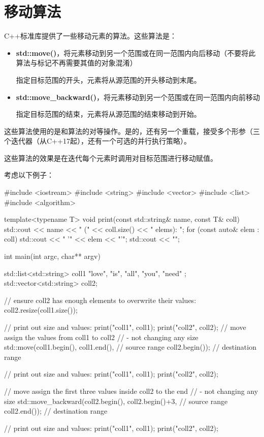 \section{移动算法}
C++标准库提供了一些移动元素的算法。这些算法是：

\begin{itemize}
	\item \textbf{std::move()}，将元素移动到另一个范围或在同一范围内向后移动（不要将此算法与标记不再需要其值的对象混淆）

	指定目标范围的开头，元素将从源范围的开头移动到末尾。
	\item \textbf{std::move_backward()}，将元素移动到另一个范围或在同一范围内向前移动

	指定目标范围的结束，元素将从源范围的结束移动到开始。
\end{itemize}

这些算法使用的是和算法的对等操作。是的，还有另一个重载，接受多个形参（三个迭代器（从C++17起），还有一个可选的并行执行策略）。

这些算法的效果是在迭代每个元素时调用对目标范围进行移动赋值。

考虑以下例子：

\begin{cppcode}
#include <iostream>
#include <string>
#include <vector>
#include <list>
#include <algorithm>

template<typename T>
void print(const std::string& name, const T& coll)
{
	std::cout << name << " (" << coll.size() << " elems): ";
	for (const auto& elem : coll) {
		std::cout << " '" << elem << "'";
	}
	std::cout << "\n";
}

int main(int argc, char** argv)
{
	std::list<std::string> coll1 { "love", "is", "all", "you", "need" };
	std::vector<std::string> coll2;

	// ensure coll2 has enough elements to overwrite their values:
	coll2.resize(coll1.size());

	// print out size and values:
	print("coll1", coll1);
	print("coll2", coll2);
	// move assign the values from coll1 to coll2
	// - not changing any size
	std::move(coll1.begin(), coll1.end(), // source range
	coll2.begin()); // destination range

	// print out size and values:
	print("coll1", coll1);
	print("coll2", coll2);

	// move assign the first three values inside coll2 to the end
	// - not changing any size
	std::move_backward(coll2.begin(), coll2.begin()+3, // source range
	coll2.end()); // destination range

	// print out size and values:
	print("coll1", coll1);
	print("coll2", coll2);
}
\end{cppcode}


